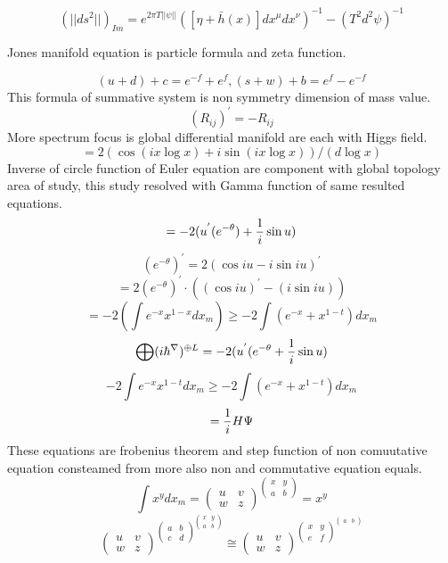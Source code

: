 \documentclass{jsarticle}
\begin{document}
{  $$ (||ds^2||)_{Im} = e^{2\pi T||\psi||}\left([\eta + \bar{h}(x)]
  dx^{\mu}dx^{\nu}\right)^{-1} - \left(T^{2} d^2 \psi\right)^{-1}$$

     Jones manifold equation is particle formula and zeta function.

  $$ (u + d) +c = e^{-f} + e^{f}, (s + w) + b = e^f - e^{-f} $$
     This formula of summative system is non symmetry dimension of mass value.
  $$ (R_{ij})^{'} = - R_{ij} $$
     More spectrum focus is global differential manifold are each with Higgs
  field.
  $$ = 2(\cos (i x \log x) + i \sin(i x \log x))/(d \log x) $$
     Inverse of circle function of Euler equation are component with 
  global topology area of study, this study resolved with Gamma function
  of same resulted equations.
  $$ = - 2 (u^{'}(e^{-\theta}) + {1 \over i}  \sin u)$$
  $$ (e^{-\theta})^{'} = 2(\cos i u - i \sin i u)^{'} $$
  $$ = 2(e^{- \theta})^{'}\cdot ((\cos i u)^{'} - (i \sin i u)) $$
  $$ = -2 (\int e^{-x}x^{1 - x}dx_m) \ge -2\int(e^{-x} + x^{1 - t})dx_m $$
  $$ \bigoplus (i \hbar^{\nabla})^{\oplus L} = - 2(u^{'}(e^{-\theta} + {1 \over
  i} \sin u) $$
  $$ -2 \int e^{-x} x^{1 - t}dx_m \ge - 2\int(e^{-x} + x^{1 - t})dx_m $$
  $$ = {1 \over i}H \Psi $$
     These equations are frobenius theorem and step function of non comuutative
  equation consteamed from more also non and commutative equation equals.
  $$ \int x^y dx_m = \begin{pmatrix} u & v \\
  w & z \end{pmatrix}^{\begin{pmatrix} x & y \\
  a & b \end{pmatrix}} = x^y  $$
  $$ \begin{pmatrix} u & v \\
  w & z \end{pmatrix}^{\begin{pmatrix}a & b \\
c & d \end{pmatrix}^{\begin{pmatrix}x & y \\
  a & b \end{pmatrix}}} \cong  \begin{pmatrix} u & v \\
  w & z \end{pmatrix}^{\begin{pmatrix} x & y \\
e & f \end{pmatrix}^{\begin{pmatrix} a & b \\

\end{pmatrix}}}$$}
\end{document}
